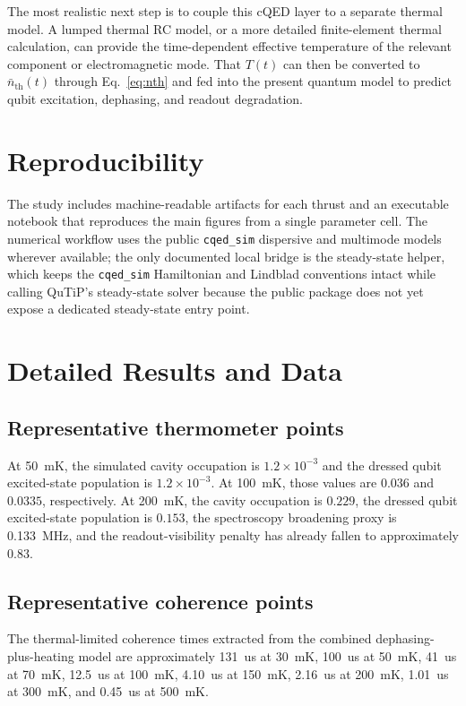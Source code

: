 \documentclass[11pt]{article}
\begin{document}
The most realistic next step is to couple this cQED layer to a separate thermal model. A lumped thermal RC model, or a more detailed finite-element thermal calculation, can provide the time-dependent effective temperature of the relevant component or electromagnetic mode. That \(T(t)\) can then be converted to \(\bar n_{\mathrm{th}}(t)\) through Eq.~\eqref{eq:nth} and fed into the present quantum model to predict qubit excitation, dephasing, and readout degradation.

\section{Reproducibility}
The study includes machine-readable artifacts for each thrust and an executable notebook that reproduces the main figures from a single parameter cell. The numerical workflow uses the public \texttt{cqed\_sim} dispersive and multimode models wherever available; the only documented local bridge is the steady-state helper, which keeps the \texttt{cqed\_sim} Hamiltonian and Lindblad conventions intact while calling QuTiP's steady-state solver because the public package does not yet expose a dedicated steady-state entry point.

\appendix
\section{Detailed Results and Data}
\subsection{Representative thermometer points}
At \SI{50}{mK}, the simulated cavity occupation is \(1.2\times 10^{-3}\) and the dressed qubit excited-state population is \(1.2\times 10^{-3}\). At \SI{100}{mK}, those values are \(0.036\) and \(0.0335\), respectively. At \SI{200}{mK}, the cavity occupation is \(0.229\), the dressed qubit excited-state population is \(0.153\), the spectroscopy broadening proxy is \SI{0.133}{MHz}, and the readout-visibility penalty has already fallen to approximately \(0.83\).

\subsection{Representative coherence points}
The thermal-limited coherence times extracted from the combined dephasing-plus-heating model are approximately \SI{131}{us} at \SI{30}{mK}, \SI{100}{us} at \SI{50}{mK}, \SI{41}{us} at \SI{70}{mK}, \SI{12.5}{us} at \SI{100}{mK}, \SI{4.10}{us} at \SI{150}{mK}, \SI{2.16}{us} at \SI{200}{mK}, \SI{1.01}{us} at \SI{300}{mK}, and \SI{0.45}{us} at \SI{500}{mK}.
\end{document}
